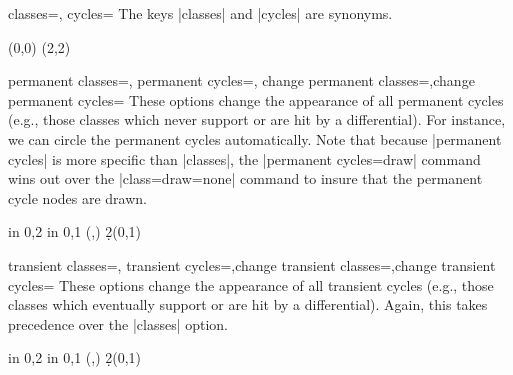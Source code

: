 \documentclass{ltxdoc}
\begin{document}
\begin{sseqdata}[name=ex1,degree={#1}{1-#1}]
\begin{keylist}{classes=, cycles=}
The keys |classes| and |cycles| are synonyms.
\begin{codeexample}[]
\begin{sseqpage}[classes={blue,fill,minimum width=0.5em}]
\class(0,0)
\class(2,2)
\end{sseqpage}
\end{codeexample}
\end{keylist}


\begin{keylist}{permanent classes=, permanent cycles=, change permanent classes=,change permanent cycles=}
These options change the appearance of all permanent cycles (e.g., those classes which never support or are hit by a differential). For instance, we can circle the permanent cycles automatically. Note that because |permanent cycles| is more specific than |classes|, the |permanent cycles={draw}| command wins out over the |class={draw=none}| command to insure that the permanent cycle nodes are drawn.
\begin{codeexample}[]
\begin{sseqpage}[cohomological Serre grading, math nodes,
                 classes={draw=none},permanent cycles={draw}]
\foreach \x in {0,2} \foreach \y in {0,1}{
    \class["\mathbb{Z}"](\x,\y)
}
\d2(0,1)
\end{sseqpage}
\end{codeexample}
\end{keylist}

\begin{keylist}{transient classes=, transient cycles=,change transient classes=,change transient cycles=}
These options change the appearance of all transient cycles (e.g., those classes which eventually support or are hit by a differential). Again, this takes precedence over the |classes| option.
\begin{codeexample}[]
\begin{sseqpage}[cohomological Serre grading, math nodes,
                 classes={draw=none}, transient cycles=red]
\foreach \x in {0,2} \foreach \y in {0,1}{
    \class["\mathbb{Z}"](\x,\y)
}
\d2(0,1)
\end{sseqpage}
\end{codeexample}
\end{keylist}


\end{sseqdata}
\end{document}
